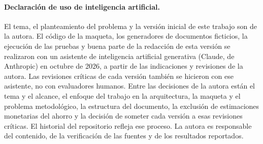 \documentclass[11pt,a4paper]{article}
\begin{document}
\paragraph{Declaración de uso de inteligencia artificial.} El tema, el planteamiento del problema y la versión inicial de este trabajo son de la autora. El código de la maqueta, los generadores de documentos ficticios, la ejecución de las pruebas y buena parte de la redacción de esta versión se realizaron con un asistente de inteligencia artificial generativa (Claude, de Anthropic) en octubre de 2026, a partir de las indicaciones y revisiones de la autora. Las revisiones críticas de cada versión también se hicieron con ese asistente, no con evaluadores humanos. Entre las decisiones de la autora están el tema y el alcance, el enfoque del trabajo en la arquitectura, la maqueta y el problema metodológico, la estructura del documento, la exclusión de estimaciones monetarias del ahorro y la decisión de someter cada versión a esas revisiones críticas. El historial del repositorio refleja ese proceso. La autora es responsable del contenido, de la verificación de las fuentes y de los resultados reportados.
\end{document}
